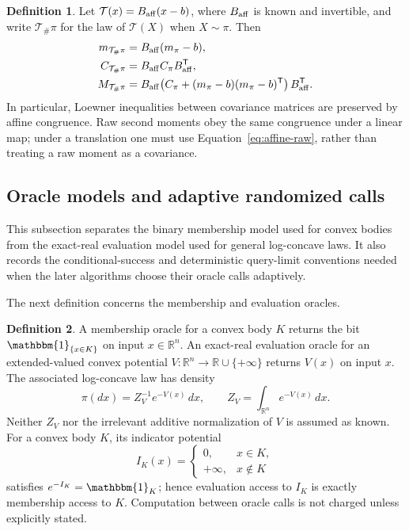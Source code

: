 \documentclass[11pt]{article}
\numberwithin{equation}{section}
\theoremstyle{definition}
\newtheorem{definition}[definition]{Definition}
\newcommand{\ind}{\mathbbm{1}}
\begin{document}
\begin{definition}
\label{def:affine-pushforward}
Let $\mathcal T(x)=B_{\rm aff}(x-b)$, where
$B_{\rm aff}$ is known and invertible, and write
$\mathcal T_\#\pi$ for the law of
$\mathcal T(X)$ when
$X\sim\pi$.
Then
\begin{align}
 m_{\mathcal T_\#\pi}
   &=B_{\rm aff}(m_\pi-b), \label{eq:affine-mean}\\
 C_{\mathcal T_\#\pi}
   &=B_{\rm aff}C_\pi B_{\rm aff}^{\mathsf T}, \label{eq:affine-cov}\\
 M_{\mathcal T_\#\pi}
   &=B_{\rm aff}\!\left(C_\pi+
      (m_\pi-b)(m_\pi-b)^{\mathsf T}\right)B_{\rm aff}^{\mathsf T}.
      \label{eq:affine-raw}
\end{align}
In particular, Loewner inequalities between covariance matrices are preserved by
affine congruence.
Raw second moments obey the same congruence under a linear map; under a
translation one must use Equation~\eqref{eq:affine-raw}, rather than treating a
raw moment as a covariance.
\end{definition}

\subsection{Oracle models and adaptive randomized calls}
\label{sec:prelim-oracles}

This subsection separates the binary membership model used for convex bodies
from the exact-real evaluation model used for general log-concave laws.
It also records the conditional-success and deterministic query-limit
conventions needed when the later algorithms choose their oracle calls
adaptively.

The next definition concerns the membership and evaluation oracles.

\begin{definition}
\label{def:oracle-models}
A membership oracle for a convex body $K$ returns the bit
$\ind_{\{x\in K\}}$ on input
$x\in\mathbb R^n$.
An exact-real evaluation oracle for an extended-valued convex potential
$V:\mathbb R^n\to\mathbb R\cup\{+\infty\}$ returns
$V(x)$ on input
$x$.
The associated log-concave law has density
\[
\pi(dx)=Z_V^{-1}e^{-V(x)}\,dx,
\qquad
Z_V=\int_{\mathbb R^n}e^{-V(x)}\,dx.
\]
Neither $Z_V$ nor the irrelevant additive normalization of
$V$ is assumed as known.
For a convex body $K$, its indicator potential
\[
 I_K(x)=
 \begin{cases}
 0,&x\in K,\\
 +\infty,&x\notin K
 \end{cases}
\]
satisfies $e^{-I_K}=\ind_{K}$; hence evaluation access to
$I_K$ is exactly membership access to
$K$.
Computation between oracle calls is not charged unless explicitly stated.
\end{definition}
\end{document}

